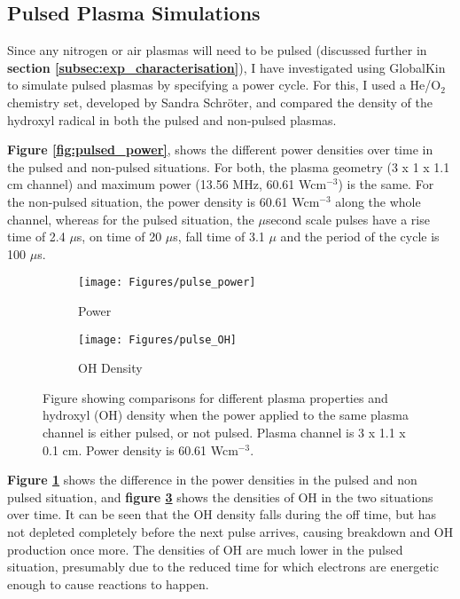 \documentclass[11pt, oneside]{article}   	%
\begin{document}
\subsection{Pulsed Plasma Simulations}

Since any nitrogen or air plasmas will need to be pulsed (discussed further in \textbf{section \ref{subsec:exp_characterisation}}), I have investigated using GlobalKin to simulate pulsed plasmas by specifying a power cycle.
For this, I used a He/O$_2$ chemistry set, developed by Sandra Schr\"oter, and compared the density of the hydroxyl radical in both the pulsed and non-pulsed plasmas.

\textbf{Figure \ref{fig:pulsed_power}}, shows the different power densities over time in the pulsed and non-pulsed situations.
For both, the plasma geometry (3 x 1 x 1.1 cm channel) and maximum power (13.56 MHz, 60.61 Wcm$^{-3}$) is the same.
For the non-pulsed situation, the power density is 60.61 Wcm$^{-3}$ along the whole channel, whereas for the pulsed situation, the $\mu$second scale pulses have a rise time of 2.4 $\mu$s, on time of 20 $\mu$s, fall time of 3.1 $\mu$ and the period of the cycle is 100 $\mu$s.

\begin{figure}
\begin{subfigure}{0.5\textwidth}
\texttt{[image: Figures/pulse\_power]}
\caption{Power}
\label{subfig:pulsed_power}
\end{subfigure}
\begin{subfigure}{0.5\textwidth}
\centering
\texttt{[image: Figures/pulse\_OH]}
\caption{OH Density}
\label{subfig:pulsed_OH}
\end{subfigure}
\caption{Figure showing comparisons for different plasma properties and hydroxyl (OH) density when the power applied to the same plasma channel is either pulsed, or not pulsed. Plasma channel is 3 x 1.1 x 0.1 cm. Power density is 60.61 Wcm$^{-3}$.}
\end{figure}

\textbf{Figure \ref{subfig:pulsed_power}} shows the difference in the power densities in the pulsed and non pulsed situation, and \textbf{figure \ref{subfig:pulsed_OH}} shows the densities of OH in the two situations over time.
It can be seen that the OH density falls during the off time, but has not depleted completely before the next pulse arrives, causing breakdown and OH production once more.
The densities of OH are much lower in the pulsed situation, presumably due to the reduced time for which electrons are energetic enough to cause reactions to happen.
\end{document}
